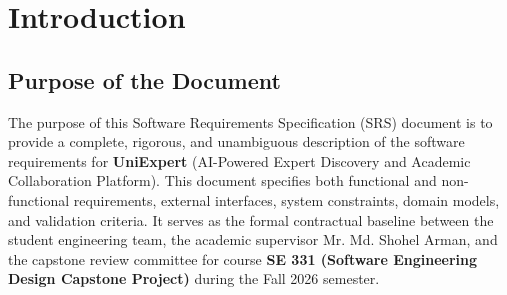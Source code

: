 \documentclass[11pt,a4paper]{article}
\begin{document}
\newpage
\tableofcontents
\vspace{0.5cm}
\listoffigures
\vspace{0.5cm}
\listoftables
\newpage

\section{Introduction}

\subsection{Purpose of the Document}
The purpose of this Software Requirements Specification (SRS) document is to provide a complete, rigorous, and unambiguous description of the software requirements for \textbf{UniExpert} (AI-Powered Expert Discovery and Academic Collaboration Platform). This document specifies both functional and non-functional requirements, external interfaces, system constraints, domain models, and validation criteria. It serves as the formal contractual baseline between the student engineering team, the academic supervisor Mr. Md. Shohel Arman, and the capstone review committee for course \textbf{SE 331 (Software Engineering Design Capstone Project)} during the Fall 2026 semester.
\end{document}
